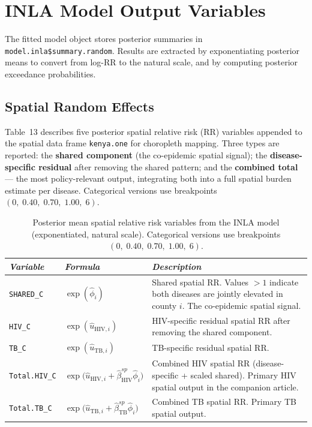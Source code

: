 \documentclass[11pt,a4paper]{article}
\newcommand{\code}[1]{\texttt{\small #1}}
\begin{document}
\section{INLA Model Output Variables}

The fitted model object stores posterior summaries in
\code{model.inla\$summary.random}. Results are extracted by exponentiating
posterior means to convert from log-RR to the natural scale, and by computing
posterior exceedance probabilities.

\subsection{Spatial Random Effects}

Table~13 describes five posterior spatial relative risk (RR) variables
appended to the spatial data frame \code{kenya.one} for choropleth mapping.
Three types are reported: the \textbf{shared component} (the co-epidemic
spatial signal); the \textbf{disease-specific residual} after removing the
shared pattern; and the \textbf{combined total} — the most policy-relevant
output, integrating both into a full spatial burden estimate per disease.
Categorical versions use breakpoints $(0,\;0.40,\;0.70,\;1.00,\;6)$.

\begin{table}[H]
\caption{Posterior mean spatial relative risk variables from the INLA model (exponentiated, natural scale). Categorical versions use breakpoints $(0,\;0.40,\;0.70,\;1.00,\;6)$.}
\renewcommand{\arraystretch}{1.10}
\scriptsize\begin{tabularx}{\textwidth}{@{}L{3.2cm}L{5.0cm}X@{}}
\toprule
\textit{Variable} & \textit{Formula} & \textit{Description}\\
\midrule
\code{SHARED\_C}
  & $\exp(\hat{\phi}_i)$
  & Shared spatial RR. Values $>1$ indicate both diseases are jointly elevated in county $i$. The co-epidemic spatial signal.\\
\code{HIV\_C}
  & $\exp(\hat{u}_{\mathrm{HIV},i})$
  & HIV-specific residual spatial RR after removing the shared component.\\
\code{TB\_C}
  & $\exp(\hat{u}_{\mathrm{TB},i})$
  & TB-specific residual spatial RR.\\
\code{Total.HIV\_C}
  & $\exp\!\bigl(\hat{u}_{\mathrm{HIV},i}+\hat{\beta}^{sp}_{\mathrm{HIV}}\hat{\phi}_i\bigr)$
  & Combined HIV spatial RR (disease-specific + scaled shared). Primary HIV spatial output in the companion article.\\
\code{Total.TB\_C}
  & $\exp\!\bigl(\hat{u}_{\mathrm{TB},i}+\hat{\beta}^{sp}_{\mathrm{TB}}\hat{\phi}_i\bigr)$
  & Combined TB spatial RR. Primary TB spatial output.\\
\bottomrule
\end{tabularx}
\renewcommand{\arraystretch}{1.10}
\end{table}
\end{document}
